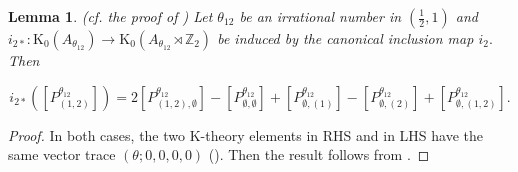 \documentclass[9pt, BCOR=2mm]{amsart}
\numberwithin{equation}{section}
\numberwithin{equation}{section}
\newtheorem{lemma}[theorem]{Lemma}
\newcommand{\Z}{{\mathbb{Z}}}
\newcommand{\K}{\mathrm{K}} %
\begin{document}
		\begin{lemma}\label{lemma:2dim-result}(cf. the proof of \cite[Corollary 7.2 ]{CL19}) Let $\theta_{12}$ be an irrational number in $(\frac{1}{2},1)$ and $i_{2*} : \K_0(A_{\theta_{12}})\longrightarrow \K_0(A_{\theta_{12}}\rtimes \Z_2)$ be induced by the canonical inclusion map $i_2.$ Then

$$i_{2*}([P_{(1,2)}^{\theta_{12}}])=	2[P_{(1,2),\emptyset} ^{\theta_{12}}]-[P_{\emptyset,\emptyset} ^{\theta_{12}}]+[P_{\emptyset,(1)} ^{\theta_{12}}]-[P_{\emptyset, (2)} ^{\theta_{12}}]+[P_{\emptyset, (1,2)} ^{\theta_{12}}].$$
	\end{lemma}
	
		\begin{proof}
		In both cases, the two K-theory elements in RHS and in LHS have the same vector trace $(\theta;0,0,0,0)$ (\cite[Page 597]{Wal95}). Then the result follows from \cite[Corollary 5.6]{Wal95}.
	\end{proof}
	
\end{document}
